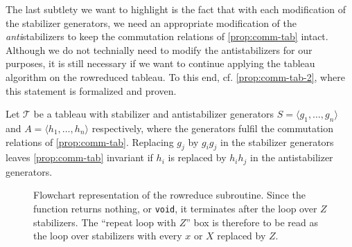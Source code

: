 The last subtlety we want to highlight is the fact that with each modification
of the stabilizer generators, we need an appropriate modification of the
\emph{anti}stabilizers to keep the commutation relations of
\cref{prop:comm-tab} intact. Although we do not technially need to modify the
antistabilizers for our purposes, it is still necessary if we want to continue
applying the tableau algorithm on the rowreduced tableau. To this end, cf.
\cref{prop:comm-tab-2}, where this statement is formalized and proven.
\begin{prop}\label{prop:comm-tab-2}
  Let $\mathcal{T}$ be a tableau with stabilizer and antistabilizer generators
  $S=\langle g_1, \ldots, g_n \rangle$ and $A=\langle h_1, \ldots, h_n \rangle$
  respectively, where the generators fulfil the commutation relations of
  \cref{prop:comm-tab}. 
  Replacing $g_j$ by $g_i g_j$ in the stabilizer generators leaves
  \cref{prop:comm-tab} invariant if $h_i$ is replaced by $h_i h_j$ in the antistabilizer
  generators.
\end{prop}
\begin{figure}[p]
  \centering
  
  \caption{Flowchart representation of the rowreduce subroutine. Since the
  function returns nothing, or \texttt{void}, it terminates after
  the loop over $Z$ stabilizers. The \enquote{repeat loop with $Z$} box is
  therefore to be read as the loop over stabilizers with every $x$ or $X$
  replaced by $Z$.}
  \label{fig:rowreduce-diag}
\end{figure}
